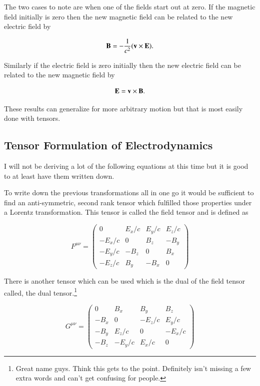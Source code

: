 \documentclass[preprint, review,12pt]{elsarticle}
\def\x{\times}
\def\b{\textbf}
\begin{document}
The two cases to note are when one of the fields start out at zero. If the magnetic field initially is zero then the new magnetic field can be related to the new electric field by

\begin{equation}
    \b B = -\frac{1}{c^2} (\b v \x \b E).
\end{equation}

Similarly if the electric field is zero initially then the new electric field can be related to the new magnetic field by

\begin{equation}
    \b E = \b v \x \b B.
\end{equation}

These results can generalize for more arbitrary motion but that is most easily done with tensors.

\subsection{Tensor Formulation of Electrodynamics}

I will not be deriving a lot of the following equations at this time but it is good to at least have them written down.

To write down the previous transformations all in one go it would be sufficient to find an anti-symmetric, second rank tensor which fulfilled those properties under a Lorentz transformation. This tensor is called the field tensor and is defined as

\begin{equation}
F^{\mu\nu} =
\begin{pmatrix}
0 & E_x/c & E_y/c & E_z/c \\
-E_x/c & 0 & B_z & -B_y \\
-E_y/c & -B_z & 0 & B_x \\
-E_z/c & B_y & -B_x & 0
\end{pmatrix}
\end{equation}

There is another tensor which can be used which is the dual of the field tensor called, the dual tensor.\footnote{Great name guys. Think this gets to the point. Definitely isn't missing a few extra words and can't get confusing for people.}

\begin{equation}
G^{\mu\nu} =
\begin{pmatrix}
0 & B_x & B_y & B_z \\
-B_x & 0 & -E_z/c & E_y/c \\
-B_y & E_z/c & 0 & -E_x/c \\
-B_z & -E_y/c & E_x/c & 0
\end{pmatrix}
\end{equation}
\end{document}
